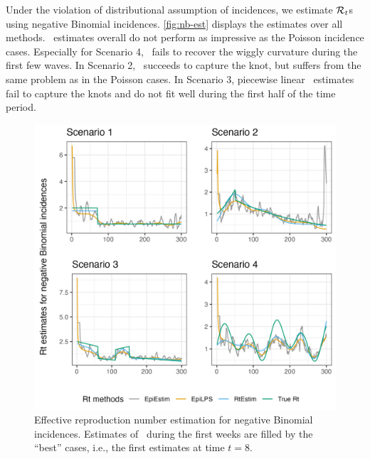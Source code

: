 Under the violation of distributional assumption of incidences, we estimate $\mathcal{R}_t$s using negative Binomial incidences. \autoref{fig:nb-est} displays the estimates over all methods. \RtEstim\ estimates overall do not perform as impressive as the Poisson incidence cases. Especially for Scenario 4, \RtEstim\ fails to recover the wiggly curvature during the first few waves. In Scenario 2, \RtEstim\ succeeds to capture the knot, but suffers from the same problem as in the Poisson cases. In Scenario 3, piecewise linear \RtEstim\ estimates fail to capture the knots and do not fit well during the first half of the time period. 
\begin{figure}[tb]
    \centering
    \includegraphics*[width=140mm]{fig/NB-res-plot.png}
    \caption{Effective reproduction number estimation for negative Binomial incidences. Estimates of \EpiEstim\ during the first weeks are filled by the ``best'' cases, i.e., the first estimates at time $t=8$.} 
    \label{fig:nb-est}
\end{figure}

